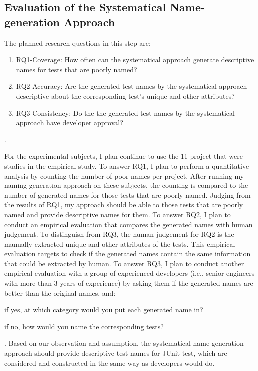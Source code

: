 \subsection{Evaluation of the Systematical Name-generation Approach}

The planned research questions in this step are:
%
\begin{enumerate}
    \item RQ1-Coverage: How often can the systematical approach generate descriptive names for tests that are poorly named?
    \item RQ2-Accuracy: Are the generated test names by the systematical approach descriptive about the corresponding test's unique and other attributes?
    \item RQ3-Consistency: Do the the generated test names by the systematical approach have developer approval?
\end{enumerate}.

For the experimental subjects, I plan continue to use the \num{11} project that were studies in the empirical study.
%
To answer RQ1, I plan to perform a quantitative analysis by counting the number of poor names per project.
%
After running my naming-generation approach on these subjects, the counting is compared to the number of generated names for those tests that are poorly named.
%
Judging from the results of RQ1, my approach should be able to those tests that are poorly named and provide descriptive names for them.
%
To answer RQ2, I plan to conduct an empirical evaluation that compares the generated names with human judgement.
%
To distinguish from RQ3, the human judgement for RQ2 is the manually extracted unique and other attributes of the tests.
%
This empirical evaluation targets to check if the generated names contain the same information that could be extracted by human.
%
To answer RQ3, I plan to conduct another empirical evaluation with a group of experienced developers (i.e., senior engineers with more than \num{3} years of experience) by asking them if the generated names are better than the original names, and:
\begin{enumerate*}
    \item if yes, at which category would you put each generated name in?
    \item if no, how would you name the corresponding tests?
\end{enumerate*}.
%
Based on our observation and assumption, the systematical name-generation approach should provide descriptive test names for JUnit test, which are considered and constructed in the same way as developers would do. 


